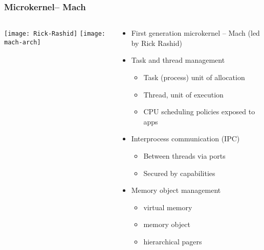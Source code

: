 \begin{frame}[plain]
	\frametitle{Microkernel-- Mach}
	
	
	\begin{columns}
		
		\begin{column}{.4\textwidth}
			\centering
			\texttt{[image: Rick-Rashid]}
			\texttt{[image: mach-arch]}
		\end{column}
		
		\begin{column}{.6\textwidth}
			
			\begin{itemize}
				\item First generation microkernel -- Mach (led by Rick Rashid)
				\item Task and thread management
				\begin{itemize}
					\item Task (process) unit of allocation
					\item Thread, unit of execution
					\item CPU scheduling policies exposed to apps
				\end{itemize}	
				\item Interprocess communication (IPC)
				\begin{itemize}
					\item Between threads via ports
					\item Secured by capabilities

				\end{itemize}				
				
				\item Memory object management
				\begin{itemize}
					\item virtual memory
					\item memory object
					\item hierarchical pagers
					
				\end{itemize}		
			\end{itemize}	
	
		\end{column}
		
		
	\end{columns}
	
\end{frame}


